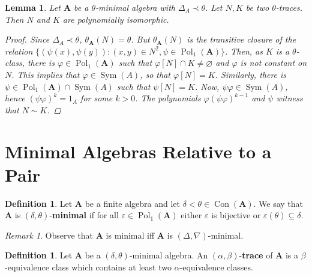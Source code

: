 \documentclass{amsart}
\theoremstyle{plain}
\newtheorem{lemma}[theorem]{Lemma}
\theoremstyle{definition}
\newtheorem{definition}[theorem]{Definition}
\theoremstyle{remark}
\newtheorem{remark}[theorem]{Remark}
\def\phi{\varphi}
\def\epsilon{\varepsilon}
\DeclareMathOperator{\Con}{Con}
\DeclareMathOperator{\Pol}{Pol}
\DeclareMathOperator{\Sym}{Sym}
\DeclareMathOperator{\M}{M}
\begin{document}
\begin{lemma}
    Let $\mathbf{A}$ be a $\theta$-minimal algebra with $\Delta_A \prec \theta$. 
    Let $N,K$ be two $\theta$-traces. 
    Then $N$ and $K$ are polynomially isomorphic. 
    \begin{proof}
        Since $\Delta_A \prec \theta$, $\theta_{\mathbf{A}}(N)=\theta$. 
        But $\theta_{\mathbf{A}}(N)$ is the transitive closure of the relation 
        $\{(\psi(x), \psi(y)) : (x,y) \in N^2, \psi \in \Pol_1(\mathbf{A})\}$. 
        Then, as $K$ is a $\theta$-class, there is $\phi \in \Pol_1(\mathbf{A})$ such that $\phi[N] \cap K \neq \varnothing$ 
        and $\phi$ is not constant on $N$. 
        This implies that $\phi \in \Sym(A)$, so that $\phi[N]=K$. 
        Similarly, there is $\psi \in \Pol_1(\mathbf{A}) \cap \Sym(A)$ such that $\psi[N]=K$. 
        Now, $\psi \phi \in \Sym(A)$, hence $(\psi \phi)^k = 1_A$ for some $k > 0$. 
        The polynomials $\phi(\psi \phi)^{k-1}$ and $\psi$ witness that $N \sim K$.
    \end{proof}
\end{lemma}

\section{Minimal Algebras Relative to a Pair} 
\begin{definition}
    Let $\mathbf{A}$ be a finite algebra and let $\delta < \theta \in \Con(\mathbf{A})$. 
    We say that $\mathbf{A}$ is $(\delta, \theta)$-\textbf{minimal} if for all $\epsilon \in \Pol_1(\mathbf{A})$ either $\epsilon$ is bijective or $\epsilon(\theta) \subseteq \delta$. 
\end{definition}

\begin{remark}
    Observe that $\mathbf{A}$ is minimal iff $\mathbf{A}$ is $(\Delta, \nabla)$-minimal. 
\end{remark}

\begin{definition}
    Let $\mathbf{A}$ be a $(\delta, \theta)$-minimal algebra. 
    An $(\alpha, \beta)$-\textbf{trace} of $\mathbf{A}$ is 
    a $\beta$-equivalence class which contains at least two $\alpha$-equivalence classes. 
\end{definition}
\end{document}
